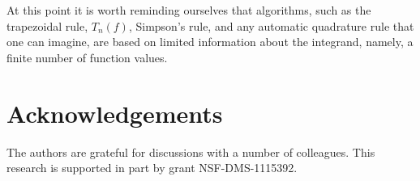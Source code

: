 \documentclass[]{amsart}
\theoremstyle{definition}
\theoremstyle{remark}
\begin{document}
At this point it is worth reminding ourselves that algorithms, such as the trapezoidal rule, $T_n(f)$, Simpson's rule, and any automatic quadrature rule that one can imagine, are based on limited information about the integrand, namely, a finite number of function values.   




\section{Acknowledgements}  The authors are grateful for discussions with a number of colleagues. This research is supported in part by grant NSF-DMS-1115392.


\end{document}

